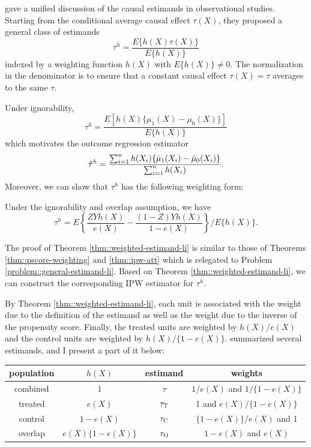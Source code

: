 \citet{li2018balancing} gave a unified discussion of the causal estimands in observational studies. Starting from the conditional average causal effect $\tau(X)$, they proposed a general class of estimands
$$
\tau^h =  \frac{  E\{ h(X) \tau(X)  \} }{ E\{ h(X)   \} }
$$
indexed by a weighting function $h(X)$ with $E\{ h(X)   \}  \neq 0$. The normalization in the denominator is to ensure that a constant causal effect $\tau(X) = \tau$ averages to the same $\tau$. 


Under ignorability, 
$$
\tau^h =  \frac{  E[  h(X)   \{ \mu_1(X) - \mu_0(X) \}   ] }{ E\{ h(X)   \} }
$$
which 
motivates the outcome regression estimator
$$
\hat \tau^h =  \frac{   \sum_{i=1}^n h(X_i)  \{ \hat{\mu}_1(X_i)   -  \hat{\mu}_0(X_i) \}  }{  \sum_{i=1}^n h(X_i) } .
$$
Moreover, we can show that $\tau^h$ has the following weighting form:

\begin{theorem}\label{thm::weighted-estimand-li}
Under the ignorability and overlap assumption, we have
$$
\tau^h = E\left\{ \frac{ZYh(X)}{ e(X)}  - \frac{(1-Z)Yh(X)}{1-e(X)}  \right\} / E\{ h(X)   \} .
$$
\end{theorem}

The proof of Theorem \ref{thm::weighted-estimand-li} is similar to those of Theorems \ref{thm::pscore-weighting} and \ref{thm::ipw-att} which is relegated to Problem \ref{problem::general-estimand-li}. Based on Theorem \ref{thm::weighted-estimand-li}, we can construct the corresponding IPW estimator for $\tau^h$. 


By Theorem \ref{thm::weighted-estimand-li}, each unit is associated with the weight due to the definition of the estimand as well as the weight due to the inverse of the propensity score. Finally, the treated units are weighted by $h(X) / e(X)$ and the control units are weighted by $h(X)/ \{  1-e(X) \}.$ \citet[][Table 1]{li2018balancing} summarized several estimands, and I present a part of it below: 

\begin{tabular}{cccc}
\hline 
 population & $h(X)$ & estimand & weights \\ \hline 
combined & $1$ & $\tau$ & $1/e(X)$ and $1/\{  1-e(X) \} $  \\
treated & $e(X)$ & $\tau_\textsc{T}$ & 1 and $ e(X)/\{  1-e(X) \}$ \\
control & $1-e(X)$ & $\tau_\textsc{C}$ & $\{  1-e(X) \} /e(X) $ and 1\\
overlap & $e(X)\{  1-e(X) \} $ &$\tau_\textsc{O}$  &  $ 1-e(X)$ and $e(X) $ \\
\hline 
\end{tabular}


